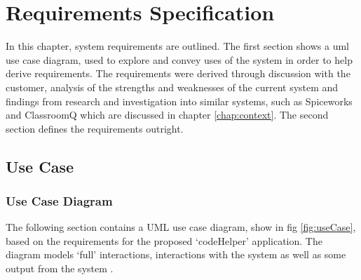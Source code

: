 \chapter{Requirements Specification}
\label{chap:req}
In this chapter, system requirements are outlined. The first section shows a \gls{uml} use case diagram, used to explore and convey uses of the system in order to help derive requirements. The requirements were derived through discussion with the customer, analysis of the strengths and weaknesses of the current system and findings from research and investigation into similar systems, such as Spiceworks and ClassroomQ which are discussed in chapter \ref{chap:context}. The second section defines the requirements outright.

\section{Use Case}
\subsection{Use Case Diagram}

The following section contains a UML use case diagram, show in fig \ref{fig:useCase}, based on the requirements for the proposed `codeHelper' application. The diagram models `full' interactions, interactions with the system as well as some output from the system \cite{uml}.

